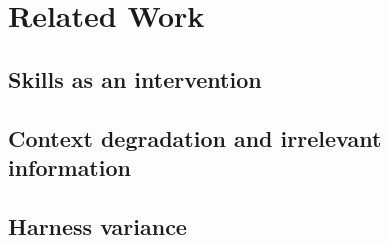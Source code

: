 \section{Related Work}
\label{sec:related}

%


\subsection{Skills as an intervention}
%

\subsection{Context degradation and irrelevant information}

\subsection{Harness variance}


